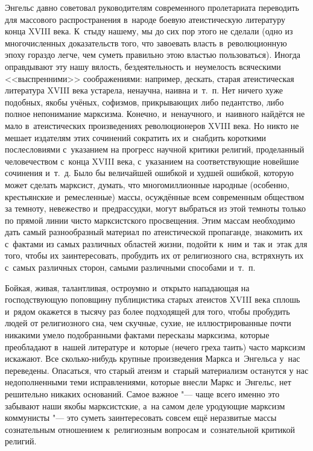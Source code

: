 Энгельс давно советовал руководителям современного пролетариата переводить
для массового распространения в~народе боевую атеистическую литературу
конца XVIII века. К~стыду
нашему, мы до сих пор этого не сделали (одно из многочисленных
доказательств того, что завоевать власть в~революционную эпоху гораздо
легче, чем суметь правильно этою властью пользоваться). Иногда
оправдывают эту нашу вялость, бездеятельность и~неумелость всяческими
<<выспренними>> соображениями: например, дескать, старая атеистическая
литература XVIII века устарела, ненаучна, наивна и~т.~п. Нет ничего хуже
подобных, якобы учёных, софизмов, прикрывающих либо педантство, либо
полное непонимание марксизма. Конечно, и~ненаучного, и~наивного найдётся
не мало в~атеистических произведениях революционеров XVIII века. Но
никто не мешает издателям этих сочинений сократить их и~снабдить
короткими послесловиями с~указанием на прогресс научной критики религий,
проделанный человечеством с~конца XVIII века, с~указанием на
соответствующие новейшие сочинения и~т.~д. Было бы величайшей ошибкой и
худшей ошибкой, которую может сделать марксист, думать, что многомиллионные
народные (особенно, крестьянские и~ремесленные) массы, осуждённые всем
современным обществом за темноту, невежество и~предрассудки, могут
выбраться из этой темноты только по прямой линии чисто марксистского
просвещения. Этим массам необходимо дать самый разнообразный материал по
атеистической пропаганде, знакомить их с~фактами из самых различных
областей жизни, подойти к~ним и~так и~этак для того, чтобы их
заинтересовать, пробудить их от религиозного сна, встряхнуть их с~самых
различных сторон, самыми различными способами и~т.~п.

Бойкая, живая, талантливая, остроумно и~открыто нападающая на господствующую
поповщину публицистика старых атеистов XVIII века сплошь и~рядом окажется
в тысячу раз более подходящей для того, чтобы пробудить людей от религиозного
сна, чем скучные, сухие, не иллюстрированные почти никакими умело
подобранными фактами пересказы марксизма, которые преобладают в~нашей
литературе и~которые (нечего греха таить) часто марксизм искажают. Все
сколько-нибудь крупные произведения Маркса и~Энгельса у~нас
переведены. Опасаться, что старый атеизм и~старый материализм останутся
у нас недополненными теми исправлениями, которые внесли Маркс и~Энгельс,
нет решительно никаких оснований. Самое важное "--- чаще всего именно это
забывают наши якобы марксистские, а~на самом деле уродующие марксизм
коммунисты "--- это суметь заинтересовать совсем ещё неразвитые массы
сознательным отношением к~религиозным вопросам и~сознательной
критикой религий.

